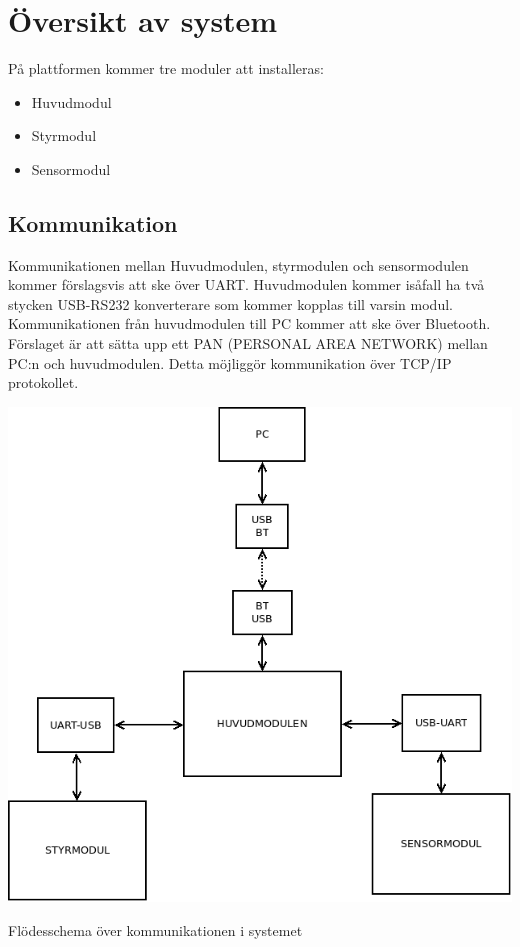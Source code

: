 \section{Översikt av system}
På plattformen kommer tre moduler att installeras:

\begin{itemize}
\item Huvudmodul
\item Styrmodul
\item Sensormodul
\end{itemize}
\subsection{Kommunikation}
Kommunikationen mellan Huvudmodulen, styrmodulen och sensormodulen kommer förslagsvis att ske över UART. Huvudmodulen kommer isåfall ha två stycken USB-RS232 konverterare som kommer kopplas till varsin modul. Kommunikationen från huvudmodulen till PC kommer att ske över Bluetooth. Förslaget är att sätta upp ett PAN (PERSONAL AREA NETWORK) mellan PC:n och huvudmodulen. Detta möjliggör kommunikation över TCP/IP protokollet.
\newline
\centerline{\includegraphics[scale=0.4]{FLOW1PNG}}
\centerline{Flödesschema över kommunikationen i systemet}
\newline
\newline
